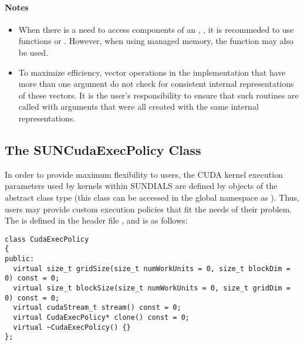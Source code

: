 \paragraph{\bf Notes}

\begin{itemize}

\item
  When there is a need to access components of an , ,
  it is recommeded to use functions  or
  . However, when using managed memory, the
  function  may also be used.

\item
  {\warn}To maximize efficiency, vector operations in the {\nveccuda} implementation
  that have more than one  argument do not check for
  consistent internal representations of these vectors. It is the user's
  responsibility to ensure that such routines are called with 
  arguments that were all created with the same internal representations.

\end{itemize}

\subsection{The SUNCudaExecPolicy Class}\label{ss:suncudaexecpolicy}

In order to provide maximum flexibility to users, the CUDA kernel execution parameters used
by kernels within SUNDIALS are defined by objects of the 
abstract class type (this class can be accessed in the global namespace as ).
Thus, users may provide custom execution policies that fit the needs of their problem. The
 is defined in the header file ,
and is as follows:

\begin{verbatim}
class CudaExecPolicy
{
public:
  virtual size_t gridSize(size_t numWorkUnits = 0, size_t blockDim = 0) const = 0;
  virtual size_t blockSize(size_t numWorkUnits = 0, size_t gridDim = 0) const = 0; 
  virtual cudaStream_t stream() const = 0;
  virtual CudaExecPolicy* clone() const = 0;
  virtual ~CudaExecPolicy() {}
};
\end{verbatim}

